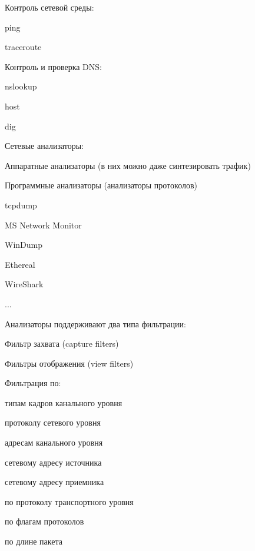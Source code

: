 Контроль сетевой среды:
\begin{MyItemize}
    \item ping
    \item traceroute
\end{MyItemize}

Контроль и проверка DNS:
\begin{MyItemize}
    \item nslookup
    \item host
    \item dig
\end{MyItemize}


Сетевые анализаторы:
\begin{MyItemize}
    \item Аппаратные анализаторы (в них можно даже синтезировать трафик)
    \item Программные анализаторы (анализаторы протоколов)
    \begin{MyItemize}
        \item tcpdump
        \item MS Network Monitor
        \item WinDump
        \item Ethereal
        \item WireShark
        \item ...
    \end{MyItemize}
\end{MyItemize}

Анализаторы поддерживают два типа фильтрации:
\begin{MyItemize}
    \item Фильтр захвата (capture filters)
    \item Фильтры отображения (view filters)
\end{MyItemize}

Фильтрация по:
\begin{MyItemize}
    \item типам кадров канального уровня
    \item протоколу сетевого уровня
    \item адресам канального уровня
    \item сетевому адресу источника
    \item сетевому адресу приемника
    \item по протоколу транспортного уровня
    \item по флагам протоколов
    \item по длине пакета
\end{MyItemize}